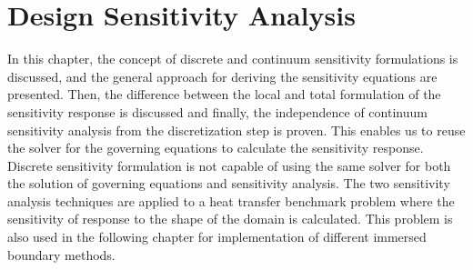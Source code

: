\chapter{Design Sensitivity Analysis}\label{ch:sensitivityAnalysis}
In this chapter, the concept of discrete and continuum sensitivity formulations is discussed, and the general approach for deriving the sensitivity equations are presented. Then, the difference between the local and total formulation of the sensitivity response is discussed and finally, the independence of continuum sensitivity analysis from the discretization step is proven. This enables us to reuse the solver for the governing equations to calculate the sensitivity response. Discrete sensitivity formulation is not capable of using the same solver for both the solution of governing equations and sensitivity analysis. The two sensitivity analysis techniques are applied to a heat transfer benchmark problem where the sensitivity of response to the shape of the domain is calculated. This problem is also used in the following chapter for implementation of different immersed boundary methods.

